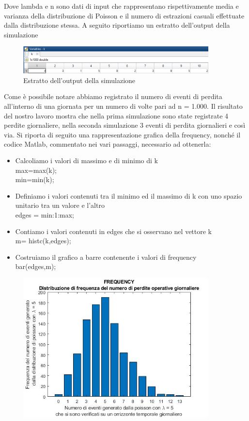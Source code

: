 \documentclass[titlepage]{article}
\begin{document}
\begin{itemize}
{Dove lambda e n sono dati di input che rappresentano rispettivamente media e varianza della distribuzione di Poisson e il numero di estrazioni casuali effettuate dalla distribuzione stessa.
A seguito riportiamo un estratto dell’output della simulazione  
\begin{figure}[htbp]
	\includegraphics[width=0.9\textwidth]{numeroeventi.png}
	\caption{\label{fig:numeroeventi.png}Estratto dell'output della simulazione }
\end{figure}
Come è possibile notare abbiamo registrato il numero di eventi di perdita all’interno di una giornata per un numero di volte pari ad n = 1.000. Il risultato del nostro lavoro mostra che nella prima simulazione sono state registrate 4 perdite giornaliere, nella seconda simulazione 3 eventi di perdita giornalieri e così via. Si riporta di seguito una rappresentazione grafica della frequency, nonché il codice Matlab, commentato nei vari passaggi, necessario ad ottenerla:
\\
\begin{itemize}
\item	Calcoliamo i valori di massimo e di minimo di k
\\
max=max(k);
\\
min=min(k);
\\
\item	Definiamo i valori contenuti tra il minimo ed il massimo di k con uno spazio unitario tra un valore e l'altro
\\
edges = min:1:max;
\\
\item	Contiamo i valori contenuti in edges che si osservano nel vettore k \\
m= histc(k,edges);
\\
\item Costruiamo il grafico a barre contenente i valori di frequency
\\
bar(edges,m);
\\
\end{itemize}
\begin{figure}[htbp]
	\centering
	\includegraphics[width=0.9\textwidth]{FREQUENCY.jpg}

\end{figure}}
\end{itemize}
\end{document}

